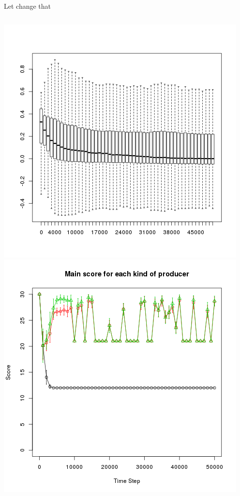 \documentclass[8pt, handout=show,notes=show]{beamer}
\begin{document}
\begin{frame}{Let change that}

	\begin{columns}
		\includegraphics[height=\textwidth]{./NonEquilibrium.png}
		\includegraphics[width=\textwidth]{./scoreEx1b.png}\\

\end{columns}
\end{frame}
\end{document}
